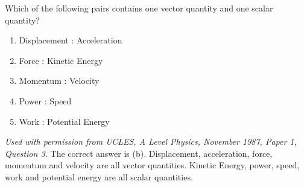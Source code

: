 
\begin{problem} 
{Which of the following pairs contains one vector quantity and one scalar quantity?
\begin{enumerate}
	\item Displacement \quad : \quad Acceleration
	\item Force \quad : \quad Kinetic Energy \answer
	\item Momentum \quad : \quad Velocity
	\item Power \quad : \quad Speed
	\item Work \quad : \quad Potential Energy
\end{enumerate}
}
{\textit{Used with permission from UCLES, A Level Physics, November 1987, Paper 1, Question 3.}}
{The correct answer is (b). Displacement, acceleration, force, momentum and velocity are all vector quantities. Kinetic Energy, power, speed, work and potential energy are all scalar quantities.}
\end{problem}